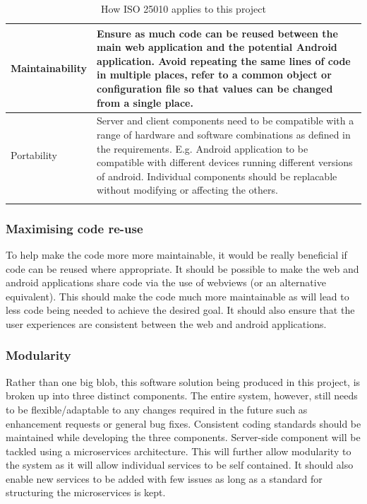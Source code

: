 \begin{longtable}{|p{}|p{}|}
    \hline
    Maintainability        & Ensure as much code can be reused between the main web application and the potential Android application. Avoid repeating the same lines of code in multiple places, refer to a common object or configuration file so that values can be changed from a single place.                                                             \\
    \hline
    Portability            & Server and client components need to be compatible with a range of hardware and software combinations as defined in the requirements. E.g. Android application to be compatible with different devices running different versions of android. Individual components should be replacable without modifying or affecting the others.\\
    \hline

    \caption{How ISO 25010 applies to this project}
\end{longtable}


\subsubsection{Maximising code re-use}
To help make the code more more maintainable, it would be really beneficial if code can be reused where appropriate. 
It should be possible to make the web and android applications share code via the use of webviews (or an alternative equivalent). 
This should make the code much more maintainable as will lead to less code being needed to achieve the desired goal. 
It should also ensure that the user experiences are consistent between the web and android applications. 

\subsubsection{Modularity}
Rather than one big blob, this software solution being produced in this project, is broken up into three distinct components.
The entire system, however, still needs to be flexible/adaptable to any changes required in the future such as enhancement requests or 
general bug fixes. 
Consistent coding standards should be maintained while developing the three components. 
Server-side component will be tackled using a microservices architecture. 
This will further allow modularity to the system as it will allow individual services to be self contained. 
It should also enable new services to be added with few issues as long as a standard for structuring the microservices is kept. 

